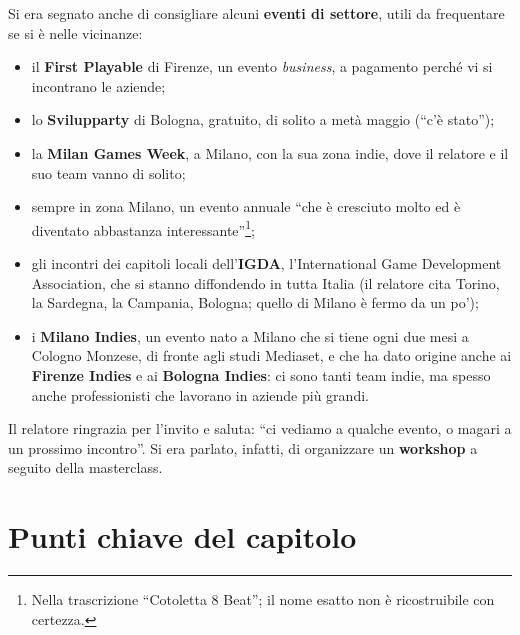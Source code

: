 Si era segnato anche di consigliare alcuni \textbf{eventi di settore}, utili da
frequentare se si è nelle vicinanze:
\begin{itemize}
  \item il \textbf{First Playable} di Firenze, un evento \emph{business}, a
        pagamento perché vi si incontrano le aziende;
  \item lo \textbf{Svilupparty} di Bologna, gratuito, di solito a metà maggio
        (``c'è stato'');
  \item la \textbf{Milan Games Week}, a Milano, con la sua zona indie, dove il
        relatore e il suo team vanno di solito;
  \item sempre in zona Milano, un evento annuale ``che è cresciuto molto ed è
        diventato abbastanza interessante''\footnote{Nella trascrizione
        ``Cotoletta 8 Beat''; il nome esatto non è ricostruibile con certezza.};
  \item gli incontri dei capitoli locali dell'\textbf{IGDA}, l'International Game
        Development Association, che si stanno diffondendo in tutta Italia (il
        relatore cita Torino, la Sardegna, la Campania, Bologna; quello di
        Milano è fermo da un po');
  \item i \textbf{Milano Indies}, un evento nato a Milano che si tiene ogni due
        mesi a Cologno Monzese, di fronte agli studi Mediaset, e che ha dato
        origine anche ai \textbf{Firenze Indies} e ai \textbf{Bologna Indies}:
        ci sono tanti team indie, ma spesso anche professionisti che lavorano
        in aziende più grandi.
\end{itemize}

Il relatore ringrazia per l'invito e saluta: ``ci vediamo a qualche evento, o
magari a un prossimo incontro''. Si era parlato, infatti, di organizzare un
\textbf{workshop} a seguito della masterclass.

\section*{Punti chiave del capitolo}

